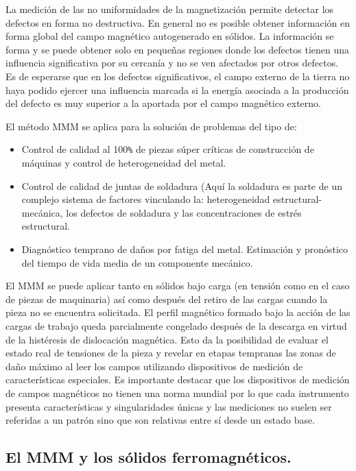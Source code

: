 La medición de las no uniformidades de la magnetización permite detectar los defectos en forma no destructiva. 
En general no es posible obtener información en forma global del campo magnético autogenerado en sólidos. La información se forma y se puede obtener solo en pequeñas regiones donde los defectos tienen una influencia significativa por su cercanía y no se ven afectados por otros defectos. Es de esperarse que en los defectos significativos, el campo externo de la tierra no haya podido ejercer una influencia marcada si la energía asociada a la producción del defecto es muy superior a la aportada por el campo magnético externo.

El método MMM se aplica para la solución de problemas del tipo de:


\begin{itemize}
	\item Control de calidad al 100\verb|%| de piezas súper críticas de construcción de máquinas y control de heterogeneidad del metal. 
	\item Control de calidad de juntas de soldadura (Aquí la soldadura es parte de un complejo sistema de factores vinculando la: heterogeneidad estructural-mecánica, los defectos de soldadura y las  concentraciones de estrés estructural. 
	\item Diagnóstico temprano de daños por fatiga del metal. Estimación y pronóstico del tiempo de vida media de un componente mecánico.
\end{itemize}


El MMM se puede aplicar tanto en sólidos bajo carga (en tensión como en el caso de piezas de maquinaria) así como después del retiro de las cargas cuando la pieza no se encuentra solicitada. El perfil magnético formado bajo la acción de las cargas de trabajo queda parcialmente congelado después de la descarga en virtud de la histéresis de dislocación magnética\citep{Dislocaciones}. Esto da la posibilidad de evaluar el estado real de tensiones de la pieza y revelar en etapas tempranas las zonas de daño máximo al leer los campos utilizando dispositivos de medición de características especiales. Es importante destacar que los dispositivos de medición de campos magnéticos no tienen una norma mundial por lo que cada instrumento presenta características y singularidades únicas y las mediciones no suelen ser referidas a un patrón sino que son relativas entre sí desde un estado base.

\subsection{El MMM y los sólidos ferromagnéticos.}

